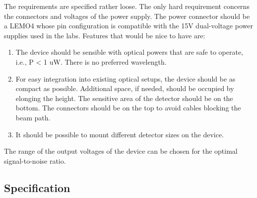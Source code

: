 The requirements are specified rather loose. The only hard requirement concerns the connectors and voltages of the power supply. The power connector should be a LEMO4 whose pin configuration is compatible with the 15V dual-voltage power supplies used in the labs. Features that would be nice to have are:
\begin{enumerate}
	\item The device should be sensible with optical powers that are safe to operate, i.e., P < 1 uW. There is no preferred wavelength.
	\item For easy integration into existing optical setups, the device should be as compact as possible. Additional space, if needed, should be occupied by elonging the height. The sensitive area of the detector should be on the bottom. The connectors should be on the top to avoid cables blocking the beam path.
	\item It should be possible to mount different detector sizes on the device.
\end{enumerate}
The range of the output voltages of the device can be chosen for the optimal signal-to-noise ratio.

\subsection{Specification}



